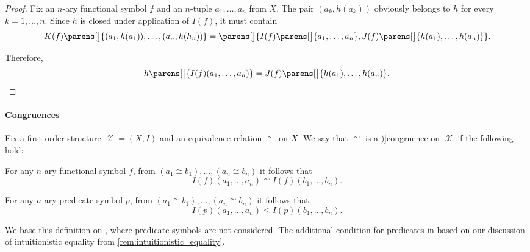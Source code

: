 \begin{proof}
  Fix an \( n \)-ary functional symbol \( f \) and an \( n \)-tuple \( a_1, \ldots, a_n \) from \( X \). The pair \( (a_k, h(a_k)) \) obviously belongs to \( h \) for every \( k = 1, \ldots, n \). Since \( h \) is closed under application of \( I(f) \), it must contain
  \begin{equation*}
    K(f)\parens[\big]{ (a_1, h(a_1)), \ldots, (a_n, h(h_n)) }
    =
    \parens[\big]{ I(f)\parens[\big]{ a_1, \ldots, a_n }, J(f)\parens[\big]{ h(a_1), \ldots, h(a_n) } }.
  \end{equation*}

  Therefore,
  \begin{equation*}
    h\parens[\big]{ I(f)(a_1, \ldots, a_n) } = J(f)\parens[\big]{ h(a_1), \ldots, h(a_n) }.
  \end{equation*}
\end{proof}

\paragraph{Congruences}

\begin{definition}\label{def:fol_congruence}\mimprovised
  Fix a \hyperref[def:fol_structure]{first-order structure} \( \mscrX = (X, I) \) and an \hyperref[def:equivalence_relation]{equivalence relation} \( {\cong} \) on \( X \). We say that \( {\cong} \) is a \term[ru=конгруэнция (\cite[46]{Мальцев1970АлгебраическиеСистемы})]{congruence} on \( \mscrX \) if the following hold:

  \begin{thmenum}
     For any \( n \)-ary functional symbol \( f \), from \( (a_1 \cong b_1), \ldots, (a_n \cong b_n) \) it follows that
    \begin{equation}\label{eq:def:fol_congruence/functions}
      I(f)(a_1, \ldots, a_n) \cong I(f)(b_1, \ldots, b_n).
    \end{equation}

     For any \( n \)-ary predicate symbol \( p \), from \( (a_1 \cong b_1), \ldots, (a_n \cong b_n) \) it follows that
    \begin{equation}\label{eq:def:fol_congruence/predicates}
      I(p)(a_1, \ldots, a_n) \leq I(p)(b_1, \ldots, b_n).
    \end{equation}
  \end{thmenum}
\end{definition}
\begin{comments}
  \item We base this definition on \cite[46]{Мальцев1970АлгебраическиеСистемы}, where predicate symbols are not considered. The additional condition for predicates in based on our discussion of intuitionistic equality from \cref{rem:intuitionistic_equality}.
\end{comments}

